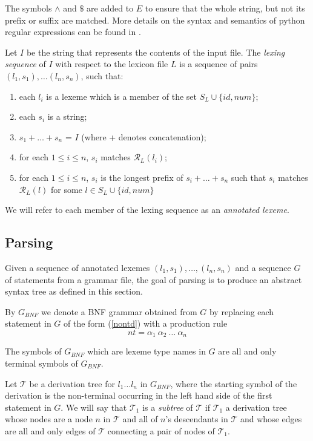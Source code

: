 \documentclass[a4paper,10pt]{article}
\def\st{\noindent}
\begin{document}
The symbols $\wedge$ and $\$$ are added to $E$ to ensure that the whole string, but not its prefix or suffix are matched. More details on  the syntax and semantics of python regular expressions can be found in \cite{pythonre}.

Let $I$ be the string that represents the contents of the input file. 
The \textit{lexing sequence} of $I$ with respect to the lexicon file $L$ is a sequence of pairs $(l_1,s_1),\ldots (l_n,s_n)$, such that:

\begin{enumerate}
\item each $l_i$ is a lexeme which is a member of the set $S_L \cup \{id,num\}$;
\item each $s_i$ is a string;
\item $s_1+\ldots+s_n$ = $I$ (where + denotes concatenation);
\item for each $1 \le i  \le n$, $s_i$ matches $\mathcal{R}_L(l_i)$;
\item for each $1 \le i \le n$, $s_i$ is the longest prefix of $s_i+\ldots+s_n$ such that $s_i$ matches  $\mathcal{R}_L(l)$ for some  $l \in  S_L \cup \{id,num\}$ 
\end{enumerate}


We will refer to each member of the lexing sequence as an \textit{annotated lexeme}.






\subsection{Parsing}\label{pars}
Given a sequence of annotated lexemes  $(l_1,s_1),\ldots, (l_n,s_n)$ and a sequence $G$ of statements  from a grammar file, the goal of parsing is to produce an abstract syntax tree  as defined in this section. 

By $G_{BNF}$ we denote a BNF grammar obtained from $G$ by 
replacing each statement in $G$ of the form
(\ref{nontd}) with a production rule
\begin{equation*}\label{grule}
nt = \alpha_1~\alpha_2~\ldots~\alpha_n 
\end{equation*}

\st
The symbols of $G_{BNF}$ which are lexeme type names in $G$ are all and only terminal symbols of $G_{BNF}$.

\st Let $\mathcal{T}$ be  a  derivation tree for $l_1\ldots l_n$ in $G_{BNF}$,  where  the starting symbol of the derivation  is the non-terminal occurring in the left hand side of the first statement in $G$. We will say that $\mathcal{T}_1$ is a \textit{subtree} of $\mathcal{T}$ if $\mathcal{T}_1$  a derivation tree whose nodes are a node $n$ in $\mathcal{T}$ and  all of $n$'s descendants in $\mathcal{T}$ and whose edges are all and only edges of $\mathcal{T}$ connecting a pair of nodes of $\mathcal{T}_1$. 
\end{document}
